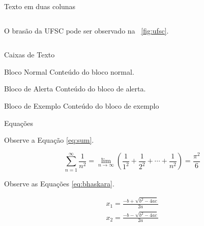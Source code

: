 \documentclass{beamer}
\begin{document}
\begin{frame}{Texto em duas colunas}
  \begin{columns}[c]
    \begin{column}{.5\textwidth}

	O brasão da UFSC pode ser observado na \figurename~\ref{fig:ufsc}.

    \end{column}
    \begin{column}{.5\textwidth}


    \end{column}
  \end{columns}
\end{frame}


\begin{frame}{Caixas de Texto}

\begin{block}{Bloco Normal}
Conteúdo do bloco normal.
\end{block}

\begin{alertblock}{Bloco de Alerta}
Conteúdo do bloco de alerta.
\end{alertblock}

\begin{exampleblock}{Bloco de Exemplo}
Conteúdo do bloco de exemplo
\end{exampleblock}

\end{frame}


\begin{frame}{Equações}

Observe a Equação \ref{eq:sum}.

\begin{equation}\label{eq:sum}
\sum_{n=1}^\infty \frac{1}{n^2} = \lim_{n \to \infty} \left( \frac{1}{1^2} + \frac{1}{2^2} + \cdots + \frac{1}{n^2} \right) = \frac{\pi^2}{6}
\end{equation}

Observe as Equações \ref{eq:bhaskara}.

\begin{equation}\label{eq:bhaskara}
\begin{split}
x_1 = \frac{-b + \sqrt{b^2 - 4ac}}{2a} \\
x_2 = \frac{-b - \sqrt{b^2 - 4ac}}{2a}
\end{split}
\end{equation}

\end{frame}


\end{document}
